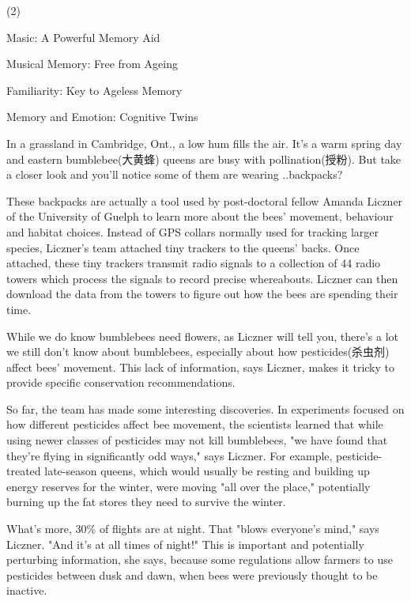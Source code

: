 \documentclass{英语试卷}
\begin{document}
\begin{choices}(2)
  \item Masic: A Powerful Memory Aid
  \item Musical Memory: Free from Ageing
  \item Familiarity: Key to Ageless Memory
  \item Memory and Emotion: Cognitive Twins
\end{choices}
\par In a grassland in Cambridge, Ont., a low hum fills the air. It's a warm spring day and eastern bumblebee(大黄蜂) queens are busy with pollination(授粉). But take a closer look and you'll notice some of them are wearing ..backpacks?\par
\par These backpacks are actually a tool used by post-doctoral fellow Amanda Liczner of the University of Guelph to learn more about the bees' movement, behaviour and habitat choices. Instead of GPS collars normally used for tracking larger species, Liczner's team attached tiny trackers to the queens' backs. Once attached, these tiny trackers transmit radio signals to a collection of 44 radio towers which process the signals to record precise whereabouts. Liczner can then download the data from the towers to figure out how the bees are spending their time.\par
\par While we do know bumblebees need flowers, as Liczner will tell you, there's a lot we still don't know about bumblebees, especially about how pesticides(杀虫剂) affect bees' movement. This lack of information, says Liczner, makes it tricky to provide specific conservation recommendations.\par
\par So far, the team has made some interesting discoveries. In experiments focused on how different pesticides affect bee movement, the scientists learned that while using newer classes of pesticides may not kill bumblebees, "we have found that they're flying in significantly odd ways," says Liczner. For example, pesticide-treated late-season queens, which would usually be resting and building up energy reserves for the winter, were moving "all over the place," potentially burning up the fat stores they need to survive the winter.\par
\par What's more, 30\% of flights are at night. That "blows everyone's mind," says Liczner. "And it's at all times of night!" This is important and potentially perturbing information, she says, because some regulations allow farmers to use pesticides between dusk and dawn, when bees were previously thought to be inactive.\par
\end{document}

